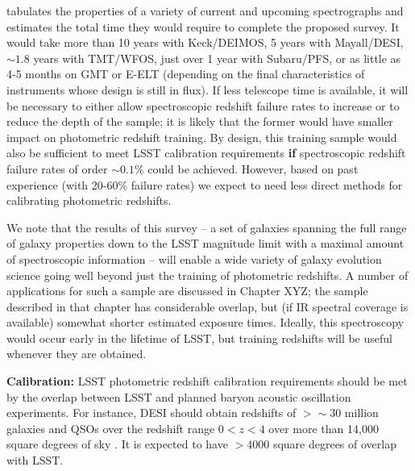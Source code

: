 \citet{Newman15} tabulates the properties of a variety of current and upcoming spectrographs and estimates the total time they would require to complete the proposed survey.  It would take more than 10 years with Keck/DEIMOS, 5 years with Mayall/DESI,  $\sim1.8$ years with TMT/WFOS, just over 1 year with Subaru/PFS, or as little as 4-5 months on GMT or E-ELT (depending on the final characteristics of instruments whose design is still in flux).  If less telescope time is available, it will be necessary to either allow spectroscopic redshift failure rates to increase or to reduce the depth of the sample; it is likely that the former would have smaller impact on photometric redshift training.  By design, this training sample would also be sufficient to meet LSST calibration requirements {\bf if} spectroscopic redshift failure rates of order $\sim 0.1\%$ could be achieved.  However, based on past experience (with 20-60\% failure rates) we expect to need less direct methods for calibrating photometric redshifts.

We note that the results of this survey -- a set of galaxies spanning the full range of galaxy properties down to the LSST magnitude limit with a maximal amount of spectroscopic information -- will enable a wide variety of galaxy evolution science going well beyond just the training of photometric redshifts.  A number of applications for such a sample are discussed in Chapter XYZ; the sample described in that chapter has considerable overlap, but (if IR spectral coverage is available) somewhat shorter estimated exposure times.  Ideally, this spectroscopy would occur early in the lifetime of LSST, but training redshifts will be useful whenever they are obtained.

{\bf Calibration:} LSST photometric redshift calibration requirements should be met by the overlap between LSST and planned baryon acoustic oscillation experiments.
For instance, DESI should obtain redshifts of $>\sim$30 million galaxies and QSOs over the redshift range $0 < z < 4$ over more than 14,000 square degrees of sky \citep{DESI}.  It is expected to have $>4000$ square degrees of overlap with LSST.


